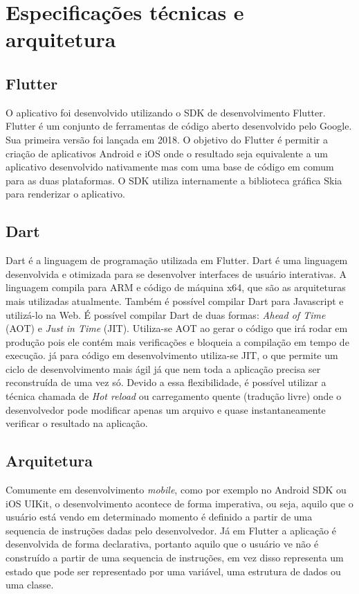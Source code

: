 \chapter{Especificações técnicas e arquitetura}

\section{Flutter}
O aplicativo foi desenvolvido utilizando o SDK de desenvolvimento Flutter. Flutter é um conjunto de ferramentas de código aberto desenvolvido pelo Google. Sua primeira versão foi lançada em 2018. O objetivo do Flutter é permitir a criação de aplicativos Android e iOS onde o resultado seja equivalente a um aplicativo desenvolvido nativamente mas com uma base de código em comum para as duas plataformas. O SDK utiliza internamente a biblioteca gráfica Skia para renderizar o aplicativo.

\section{Dart}
Dart é a linguagem de programação utilizada em Flutter. Dart é uma linguagem desenvolvida e otimizada para se desenvolver interfaces de usuário interativas. A linguagem compila para ARM e código de máquina x64, que são as arquiteturas mais utilizadas atualmente. Também é possível compilar Dart para Javascript e utilizá-lo na Web. É possível compilar Dart de duas formas: \textit{Ahead of Time} (AOT) e \textit{Just in Time} (JIT). Utiliza-se AOT ao gerar o código que irá rodar em produção pois ele contém mais verificações e bloqueia a compilação em tempo de execução. já para código em desenvolvimento utiliza-se JIT, o que permite um ciclo de desenvolvimento mais ágil já que nem toda a aplicação precisa ser reconstruída de uma vez só. Devido a essa flexibilidade, é possível utilizar a técnica chamada de \textit{Hot reload} ou carregamento quente (tradução livre) onde o desenvolvedor pode modificar apenas um arquivo e quase instantaneamente verificar o resultado na aplicação.

\section{Arquitetura}
Comumente em desenvolvimento \textit{mobile}, como por exemplo no Android SDK ou iOS UIKit, o desenvolvimento acontece de forma imperativa, ou seja, aquilo que o usuário está vendo em determinado momento é definido a partir de uma sequencia de instruções dadas pelo desenvolvedor. Já em Flutter a aplicação é desenvolvida de forma declarativa, portanto aquilo que o usuário ve não é construído a partir de uma sequencia de instruções, em vez disso representa um estado que pode ser representado por uma variável, uma estrutura de dados ou uma classe.

